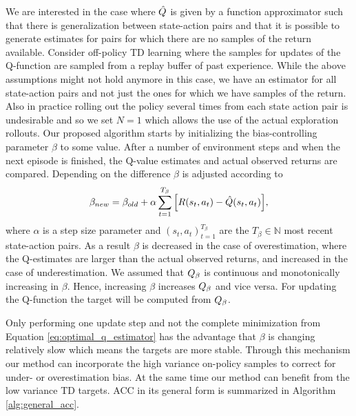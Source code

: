 We are interested in the case where $\hat{Q}$ is given by a function approximator such that there is generalization between state-action pairs and that it is possible to generate estimates for pairs for which there are no samples of the return available.
Consider off-policy TD learning where the samples for updates of the Q-function are sampled from a replay buffer of past experience.
While the above assumptions might not hold anymore in this case, we have an estimator for all state-action pairs and not just the ones for which we have samples of the return.
Also in practice rolling out the policy several times from each state action pair is undesirable and so we set $N=1$ which allows the use of the actual exploration rollouts.
Our proposed algorithm starts by initializing the bias-controlling parameter $\beta$ to some value.
After a number of environment steps and when the next episode is finished, the Q-value estimates and actual observed returns are compared. Depending on the difference $\beta$ is adjusted according to  
\vspace{-0.2cm}
\begin{equation}
    \beta_{new} = \beta_{old} + \alpha \sum_{t=1}^{T_\beta} \Big[   R (s_t, a_t) - \hat{Q} (s_t, a_t) \Big], 
    \label{eq:one_step_beta_update}
\vspace{-0.2cm}
\end{equation}
where $\alpha$ is a step size parameter and $(s_t, a_t)_{t=1}^{T_\beta}$ are the $T_\beta \in \mathbb{N}$ most recent state-action pairs.
As a result $\beta$ is decreased in the case of overestimation, where the Q-estimates are larger than the actual observed returns, 
and increased in the case of underestimation. 
We assumed that $Q_{\beta}$ is continuous and monotonically increasing in $\beta$.  Hence, increasing $\beta$ increases $Q_{\beta}$ and vice versa.
For updating the Q-function the target will be computed from $Q_{\beta}$.



Only performing one update step and not the complete minimization from Equation \ref{eq:optimal_q_estimator} has the advantage that $\beta$ is changing relatively slow which means the targets are more stable.
Through this mechanism our method can incorporate the high variance on-policy samples to correct for under- or overestimation bias. 
At the same time our method can benefit from the low variance TD targets.
ACC in its general form is summarized  in Algorithm \ref{alg:general_acc}.






